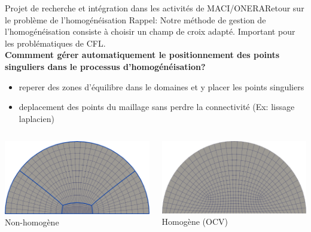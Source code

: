 \documentclass[compress,10pt,aspectratio=169]{beamer}
\begin{document}
\begin{frame}{\large Projet de recherche et intégration dans les activités de MACI/ONERA}{Retour sur le problème de l'homogénéisation}
\small
Rappel: Notre méthode de gestion de l'homogénéisation consiste à choisir un champ de croix adapté. Important pour les problématiques de CFL.\\\vspace{0.2cm}
{\bf Commment gérer automatiquement le positionnement des points singuliers dans le processus d'homogénéisation?}\\\vspace{0.2cm}
\begin{itemize}
    \item reperer des zones d'équilibre dans le domaines et y placer les points singuliers
    \item deplacement des points du maillage sans perdre la connectivité (Ex: lissage laplacien)\\\vspace{0.2cm}
\end{itemize}
\begin{columns}
    \begin{column}{0.55\textwidth}
\centering
\includegraphics[scale=0.09]{images/non_homo_demiDisc.pdf}\\
\footnotesize Non-homogène
    \end{column}
    \begin{column}{0.55\textwidth}
        \centering
\includegraphics[scale=0.09]{images/homo_avec_bord_demiDisc.pdf}\\
\footnotesize Homogène (OCV)
    \end{column}
\end{columns}
\end{frame}
\end{document}

